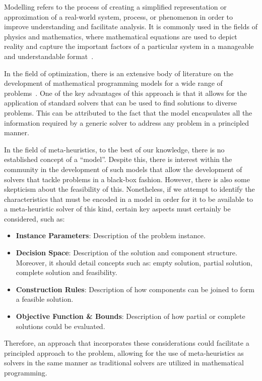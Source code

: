 Modelling refers to the process of creating a simplified representation or
approximation of a real-world system, process, or phenomenon in order to improve
understanding and facilitate analysis. It is commonly used in the fields of
physics and mathematics, where mathematical equations are used to depict reality
and capture the important factors of a particular system in a manageable and
understandable format~\cite{witelski2015methods}.

In the field of optimization, there is an extensive body of literature on the
development of mathematical programming models for a wide range of
problems~\cite{papadimitriou1998combinatorial,nocedal2006numerical,williamson2011design}.
One of the key advantages of this approach is that it
allows for the application of standard solvers that can be used to find
solutions to diverse problems. This can be attributed to the fact that the model
encapsulates all the information required by a generic solver to address any
problem in a principled manner.

In the field of meta-heuristics, to the best of our knowledge, there is no
established concept of a ``model''. Despite this, there is interest within the
community in the development of such models that allow the development of
solvers that tackle problems in a black-box fashion. However, there is also some
skepticism about the feasibility of this. Nonetheless, if we attempt to identify
the characteristics that must be encoded in a model in order for it to be
available to a meta-heuristic solver of this kind, certain key aspects must
certainly be considered, such as:

\begin{itemize}
  \item \textbf{Instance Parameters}: Description of the problem instance.
  \item \textbf{Decision Space}: Description of the solution and component
        structure. Moreover, it should detail concepts such as: empty
        solution, partial solution, complete solution and feasibility.
  \item \textbf{Construction Rules}: Description of how components can be
        joined to form a feasible solution.
  \item \textbf{Objective Function \& Bounds}: Description of how partial or
        complete solutions could be evaluated.
\end{itemize}

Therefore, an approach that incorporates these considerations could facilitate a
principled approach to the problem, allowing for the use of meta-heuristics as
solvers in the same manner as traditional solvers are utilized in mathematical
programming.

